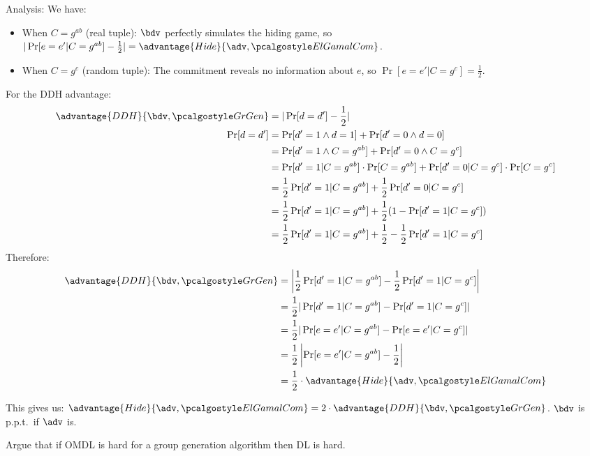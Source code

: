 \begin{mysolution}
  Analysis: We have:
  \begin{itemize}
      \item When $C = g^{ab}$ (real tuple): $\bdv$ perfectly simulates the hiding game, so $|\Pr[e = e' | C = g^{ab}] - \frac{1}{2}| = \advantage{Hide}{\adv, \algo{ElGamalCom}}$.
      \item When $C = g^c$ (random tuple): The commitment reveals no information about $e$, so $\Pr[e = e' | C = g^c] = \frac{1}{2}$.
  \end{itemize}
  For the DDH advantage:
  \begin{align}
  \advantage{DDH}{\bdv, \grgen} &= |\Pr[d = d'] - \frac{1}{2}|\\
  \Pr[d = d'] &= \Pr[d' = 1 \wedge d = 1] + \Pr[d' = 0 \wedge d = 0]\\
  &= \Pr[d' = 1 \wedge C = g^{ab}] + \Pr[d' = 0 \wedge C = g^c]\\
  &= \Pr[d' = 1 | C = g^{ab}] \cdot \Pr[C = g^{ab}] + \Pr[d' = 0 | C = g^c] \cdot \Pr[C = g^c]\\
  &= \frac{1}{2} \Pr[d' = 1 | C = g^{ab}] + \frac{1}{2} \Pr[d' = 0 | C = g^c]\\
  &= \frac{1}{2} \Pr[d' = 1 | C = g^{ab}] + \frac{1}{2}(1 - \Pr[d' = 1 | C = g^c])\\
  &= \frac{1}{2} \Pr[d' = 1 | C = g^{ab}] + \frac{1}{2} - \frac{1}{2}\Pr[d' = 1 | C = g^c]
  \end{align}
  Therefore:
  \begin{align}
  \advantage{DDH}{\bdv, \grgen} &= \left|\frac{1}{2} \Pr[d' = 1 | C = g^{ab}] - \frac{1}{2}\Pr[d' = 1 | C = g^c]\right|\\
  &= \frac{1}{2} |\Pr[d' = 1 | C = g^{ab}] - \Pr[d' = 1 | C = g^c]|\\
  &= \frac{1}{2} |\Pr[e = e' | C = g^{ab}] - \Pr[e = e' | C = g^c]|\\
  &= \frac{1}{2} \left|\Pr[e = e' | C = g^{ab}] - \frac{1}{2}\right|\\
  &= \frac{1}{2} \cdot \advantage{Hide}{\adv, \algo{ElGamalCom}}
  \end{align}

  This gives us: $\advantage{Hide}{\adv, \algo{ElGamalCom}} = 2 \cdot \advantage{DDH}{\bdv, \grgen}$. $\bdv$ is p.p.t.\ if $\adv$ is.
\end{mysolution}
\fi

\begin{exercise}
  Argue that if OMDL is hard for a group generation algorithm then DL is hard.
\end{exercise}


